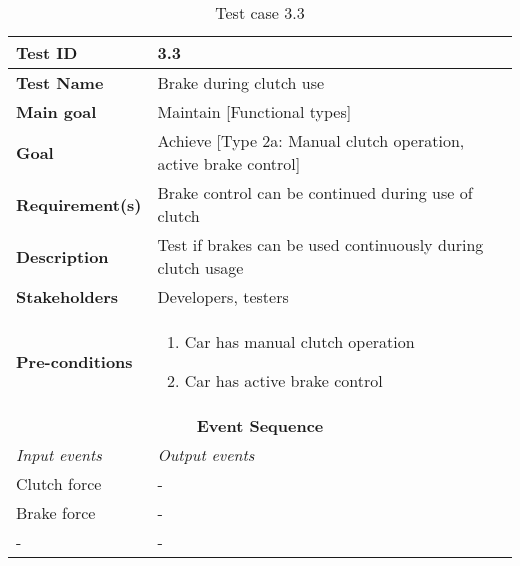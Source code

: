 \begin{table}[H]
\centering
\begin{tabularx}{\linewidth}{X|X}
  \hline
  \textbf{Test ID} & 3.3\\
  \hline
  \textbf{Test Name} &  Brake during clutch use\\
  \hline
  \textbf{Main goal} &  Maintain [Functional types]\\
  \hline
  \textbf{Goal} & Achieve [Type 2a: Manual clutch operation, active brake control] \\
  \hline
  \textbf{Requirement(s)} &  Brake control can be continued during use of clutch\\
  \hline
  \textbf{Description} &  Test if brakes can be used continuously during clutch usage\\
  \hline
  \textbf{Stakeholders} &  Developers, testers\\
  \hline
  \textbf{Pre-conditions} &  
  \begin{enumerate}
      \item Car has manual clutch operation
      \item Car has active brake control
  \end{enumerate}\\
  \hline
  \multicolumn{2}{c}{\textbf{Event Sequence}} \\
  \hline
  \textit{Input events} & \textit{Output events} \\
  \hline
   Clutch force & - \\
  \hline
   Brake force & - \\
  \hline
  - & - \\
  \hline
  \end{tabularx}
\caption{\label{tab_caseX} Test case 3.3}
\end{table}

